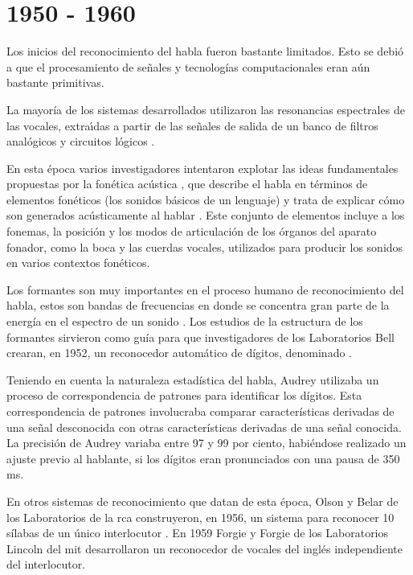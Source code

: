 \section{1950 - 1960}
\label{sec:50s}

Los inicios del reconocimiento del habla fueron bastante limitados. Esto se debi\'o a que el procesamiento 
de se\~{n}ales y tecnolog\'{i}as computacionales eran a\'un bastante primitivas. 

La mayor\'{i}a de los sistemas desarrollados utilizaron las resonancias espectrales de las vocales,
extra{\'\i}das a partir de las se\~nales de salida de un banco de filtros anal\'{o}gicos y 
circuitos l\'ogicos \cite{Furui50Years2004}.
 
En esta \'{e}poca varios investigadores intentaron explotar las ideas fundamentales propuestas por 
la fon\'{e}tica ac\'{u}stica \cite{AnusuyaSpeech2009}, que describe el habla en t\'{e}rminos de 
elementos fon\'{e}ticos (los sonidos b\'{a}sicos de un lenguaje) y trata de
explicar c\'{o}mo son generados ac\'{u}sticamente al hablar \cite{JuangAutomaticSpeech}. 
Este conjunto de elementos incluye a los fonemas, la posici\'on y los modos de articulaci\'on 
de los \'organos del aparato fonador, como la boca y las cuerdas vocales, utilizados para 
producir los sonidos en varios contextos fon\'{e}ticos.

Los formantes son muy importantes en el proceso humano de reconocimiento del habla, estos son 
bandas de frecuencias en donde se concentra gran parte de la energ\'{i}a en el espectro de un 
sonido \cite{HawkinsAcoustic2009}. Los estudios de la estructura de los formantes sirvieron 
como gu\'{i}a para que investigadores de los Laboratorios Bell crearan, en 1952, un reconocedor
autom\'{a}tico de d\'{i}gitos, denominado  \cite{DavisAutomatic1952}.

Teniendo en cuenta la naturaleza estad\'{i}stica del habla, Audrey utilizaba un proceso de 
correspondencia de patrones para identificar los d\'{i}gitos. Esta correspondencia de patrones 
involucraba comparar caracter\'{i}sticas derivadas de una se\~{n}al desconocida con otras 
caracter\'{i}sticas derivadas de una se\~{n}al conocida. La precisi\'{o}n de
Audrey variaba entre 97 y 99 por ciento, habi\'endose realizado un ajuste previo al hablante,
si los d\'{i}gitos eran pronunciados con una pausa de 350 ms\cite{DavisAutomatic1952}.

En otros sistemas de reconocimiento que datan de esta \'{e}poca, Olson y Belar de los Laboratorios 
de la \gls{rca} construyeron, en 1956, un sistema para reconocer 10 s\'{i}labas de un \'{u}nico 
interlocutor \cite{OlsonPhonetic1956}. En 1959 Forgie y Forgie de los Laboratorios Lincoln del \gls{mit} 
desarrollaron un reconocedor de vocales del ingl\'{e}s independiente del 
interlocutor\cite{ForgieResults1959}.
